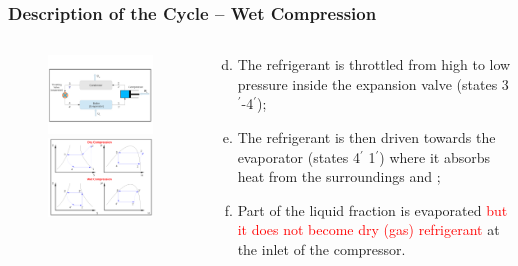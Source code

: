\documentclass[10pt,compress,handout,ignorenonframetext]{beamer}
\begin{document}
\begin{frame}
 \frametitle{Description of the Cycle -- Wet Compression}
  \begin{columns}
   \begin{column}[c]{0.5\linewidth}
    \begin{figure}%
     \vbox{
      \includegraphics[width=5.5cm,clip]{./Pics/Overview_Refrig12}
      \vspace{-.5cm}
      \includegraphics[width=4.5cm,clip]{./Pics/Overview_Refrig13}}
    \end{figure}  
   \end{column}  
   \begin{column}[c]{0.5\linewidth}
  \begin{enumerate}[(a)]\setcounter{enumi}{3}
   \item <1-> The refrigerant is throttled from high to low pressure inside the expansion valve (states 3$^{\prime}$-4$^{\prime}$);
   \item <2-> The refrigerant is then driven towards the evaporator (states 4$^{\prime}$ 1$^{\prime}$) where it absorbs heat from the surroundings and ;
   \item <3-> Part of the liquid fraction is evaporated \textcolor{red}{but it does not become dry (gas) refrigerant} at the inlet of the compressor.
  \end{enumerate}
 \end{column}  
\end{columns}
\end{frame}
\end{document}
